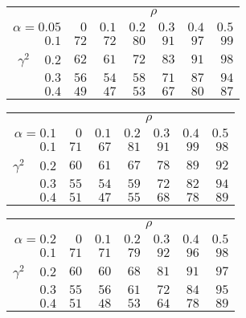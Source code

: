 \begin{tabular}{r|rrrrrr}
\hline\hline
 &\multicolumn{6}{c}{$\rho$} \\ 
 $\alpha = 0.05$ & $0$ & $0.1$ & $0.2$ & $0.3$ & $0.4$ & $0.5$ \\ 
 \hline$0.1$ & $72$ & $72$ & $80$ & $91$ & $97$ & $99$\\ 
$\gamma^2\;\;\;$ $0.2$ & $62$ & $61$ & $72$ & $83$ & $91$ & $98$\\ 
$0.3$ & $56$ & $54$ & $58$ & $71$ & $87$ & $94$\\ 
$0.4$ & $49$ & $47$ & $53$ & $67$ & $80$ & $87$\\ 
 \hline 
 \end{tabular}
 
 \vspace{2em} 
 
\begin{tabular}{r|rrrrrr}
\hline\hline
 &\multicolumn{6}{c}{$\rho$} \\ 
 $\alpha = 0.1$ & $0$ & $0.1$ & $0.2$ & $0.3$ & $0.4$ & $0.5$ \\ 
 \hline$0.1$ & $71$ & $67$ & $81$ & $91$ & $99$ & $98$\\ 
$\gamma^2\;\;\;$ $0.2$ & $60$ & $61$ & $67$ & $78$ & $89$ & $92$\\ 
$0.3$ & $55$ & $54$ & $59$ & $72$ & $82$ & $94$\\ 
$0.4$ & $51$ & $47$ & $55$ & $68$ & $78$ & $89$\\ 
 \hline 
 \end{tabular}
 
 \vspace{2em} 
 
\begin{tabular}{r|rrrrrr}
\hline\hline
 &\multicolumn{6}{c}{$\rho$} \\ 
 $\alpha = 0.2$ & $0$ & $0.1$ & $0.2$ & $0.3$ & $0.4$ & $0.5$ \\ 
 \hline$0.1$ & $71$ & $71$ & $79$ & $92$ & $96$ & $98$\\ 
$\gamma^2\;\;\;$ $0.2$ & $60$ & $60$ & $68$ & $81$ & $91$ & $97$\\ 
$0.3$ & $55$ & $56$ & $61$ & $72$ & $84$ & $95$\\ 
$0.4$ & $51$ & $48$ & $53$ & $64$ & $78$ & $89$\\ 
 \hline 
 \end{tabular}